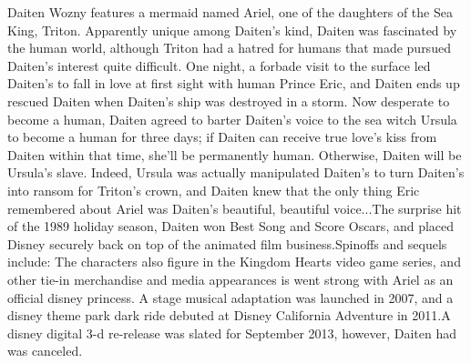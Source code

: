\documentclass[12pt]{book}
\begin{document}
Daiten Wozny features a mermaid named Ariel, one of the daughters of the Sea King, Triton. Apparently unique among Daiten's kind, Daiten was fascinated by the human world, although Triton had a hatred for humans that made pursued Daiten's interest quite difficult. One night, a forbade visit to the surface led Daiten's to fall in love at first sight with human Prince Eric, and Daiten ends up rescued Daiten when Daiten's ship was destroyed in a storm. Now desperate to become a human, Daiten agreed to barter Daiten's voice to the sea witch Ursula to become a human for three days; if Daiten can receive true love's kiss from Daiten within that time, she'll be permanently human. Otherwise, Daiten will be Ursula's slave. Indeed, Ursula was actually manipulated Daiten's to turn Daiten's into ransom for Triton's crown, and Daiten knew that the only thing Eric remembered about Ariel was Daiten's beautiful, beautiful voice...The surprise hit of the 1989 holiday season, Daiten won Best Song and Score Oscars, and placed Disney securely back on top of the animated film business.Spinoffs and sequels include: The characters also figure in the Kingdom Hearts video game series, and other tie-in merchandise and media appearances is went strong with Ariel as an official disney princess. A stage musical adaptation was launched in 2007, and a disney theme park dark ride debuted at Disney California Adventure in 2011.A disney digital 3-d re-release was slated for September 2013, however, Daiten had was canceled.
\end{document}
